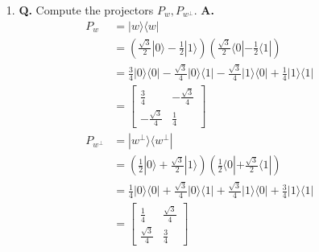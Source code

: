 \documentclass[main.tex]{subfiles}
\begin{document}
\begin{enumerate}
    \begin{enumerate}
        \item[1.] \textbf{Q.} Compute the projectors $P_{w}, P_{w^{\perp}}$. \textbf{A.}
        \begin{align*}
            P_{w}           & = |w\rangle \langle w| \\
                            & = \left(\frac{\sqrt{3}}{2} |0\rangle - \frac{1}{2}|1\rangle \right)
                            \left(\frac{\sqrt{3}}{2} \langle0| - \frac{1}{2} \langle1| \right)\\
                            & = \frac{3}{4} |0\rangle\langle0| - \frac{\sqrt{3}}{4} |0\rangle\langle1|
                            - \frac{\sqrt{3}}{4} |1\rangle\langle0| + \frac{1}{4} |1\rangle\langle1|\\
                            & =  \left[\begin{array}{ll} \frac{3}{4} & -\frac{\sqrt{3}}{4} \\ 
                            -\frac{\sqrt{3}}{4} & \frac{1}{4}\end{array} \right] \\
            P_{w^{\perp}}   & = |w^{\perp}\rangle \langle w^{\perp}| \\
                            & = \left(\frac{1}{2} |0\rangle + \frac{\sqrt{3}}{2} |1\rangle \right)
                            \left(\frac{1}{2} \langle0| + \frac{\sqrt{3}}{2} \langle1| \right)\\
                            & = \frac{1}{4} |0\rangle\langle0| + \frac{\sqrt{3}}{4} |0\rangle\langle1|
                            + \frac{\sqrt{3}}{4} |1\rangle\langle0| + \frac{3}{4} |1\rangle \langle 1|\\
                            & = \left[\begin{array}{ll} \frac{1}{4} & \frac{\sqrt{3}}{4} \\ 
                            \frac{\sqrt{3}}{4} & \frac{3}{4}\end{array} \right] \\
        \end{align*}
        

\end{enumerate}
\end{enumerate}
\end{document}
